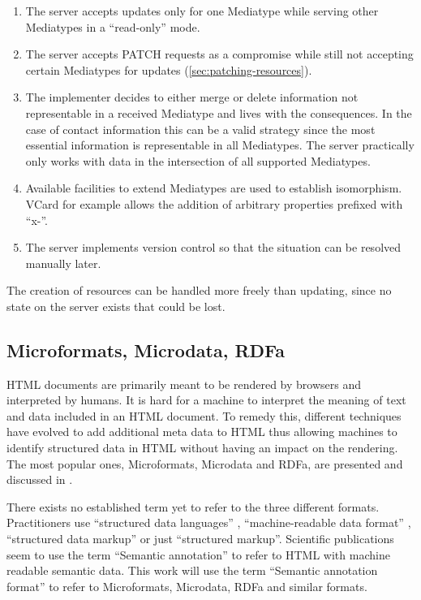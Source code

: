 \documentclass[11pt,a4paper,headsepline,twoside]{scrartcl}		%
\begin{document}
\begin{enumerate}
\item The server accepts updates only for one Mediatype while serving other
  Mediatypes in a ``read-only'' mode.
\item The server accepts PATCH requests \cite{RFC5789} as a compromise while
  still not accepting certain Mediatypes for updates
  (\autoref{sec:patching-resources}).
\item The implementer decides to either merge or delete information not
  representable in a received Mediatype and lives with the consequences. In the
  case of contact information this can be a valid strategy since the most
  essential information is representable in all Mediatypes. The server
  practically only works with data in the intersection of all supported
  Mediatypes.
\item Available facilities to extend Mediatypes are used to establish
  isomorphism. VCard for example allows the addition of arbitrary properties
  prefixed with ``x-''.
\item The server implements version control so that the situation can be
  resolved manually later.
\end{enumerate}

The creation of resources can be handled more freely than updating, since no
state on the server exists that could be lost.

\subsection{Microformats, Microdata, RDFa}
\label{sec:microdata}

HTML documents are primarily meant to be rendered by browsers and interpreted by
humans. It is hard for a machine to interpret the meaning of text and data
included in an HTML document. To remedy this, different techniques have evolved to
add additional meta data to HTML thus allowing machines to identify structured
data in HTML without having an impact on the rendering. The most popular ones,
Microformats, Microdata and RDFa, are presented and discussed in
\cite{Tennison2012}.

There exists no established term yet to refer to the three different
formats. Practitioners use ``structured data languages'' \cite{Sporny2011},
``machine-readable data format'' \cite{Hickson2011}, ``structured data
markup'' \cite{Goel2011} or just ``structured markup''. Scientific publications
seem to use the term ``Semantic annotation'' \cite{instance7} to refer to HTML
with machine readable semantic data. This work will use the term ``Semantic
annotation format'' to refer to Microformats, Microdata, RDFa and similar
formats.
\end{document}
